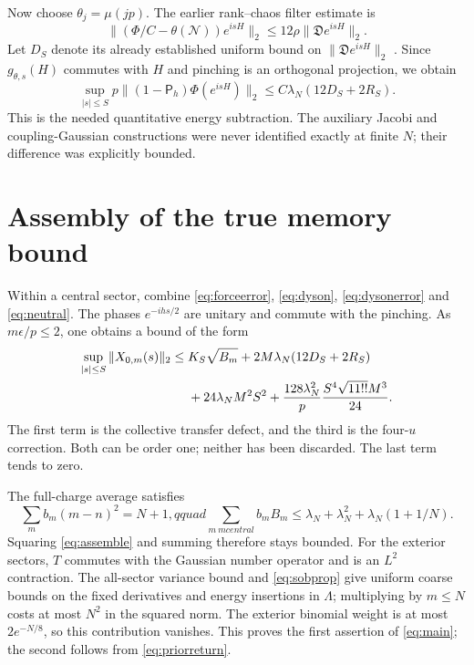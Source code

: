 \documentclass[11pt,a4paper]{article}
\newcommand{\NN}{\mathcal N}
\newcommand{\DD}{\mathfrak D}
\newcommand{\PP}{\mathsf P_h}
\begin{document}
Now choose $\theta_j=\mu(jp)$. The earlier rank--chaos filter estimate is
\begin{equation}
 \|(\Phi/C-\theta(\NN))e^{isH}\|_2
 \le12\rho\|\DD e^{isH}\|_2.
\end{equation}
Let $D_S$ denote its already established uniform bound on
$\|\DD e^{isH}\|_2$ \cite{Rank}. Since $g_{\theta,s}(H)$ commutes
with $H$ and pinching is an orthogonal projection, we obtain
\begin{equation}
 \boxed{\quad
 \sup_{|s|\le S}p\|(1-\PP)\Phi(e^{isH})\|_2
 \le C\lambda_N(12D_S+2R_S).\quad}
 \label{eq:neutral}
\end{equation}
This is the needed quantitative energy subtraction. The auxiliary
Jacobi and coupling-Gaussian constructions were never identified
exactly at finite $N$; their difference was explicitly bounded.

\newpage
\section{Assembly of the true memory bound}
Within a central sector, combine \eqref{eq:forceerror},
\eqref{eq:dyson}, \eqref{eq:dysonerror} and \eqref{eq:neutral}.
The phases $e^{-ihs/2}$ are unitary and commute with the pinching.
As $m\epsilon/p\le2$, one obtains a bound of the form
\begin{align}
 \sup_{|s|\le S}\|X_{0,m}(s)\|_2
 \le{}&K_S\sqrt{B_m}
       +2M\lambda_N(12D_S+2R_S)\notag\\
      &+24\lambda_NM^2S^2
       +\frac{128\lambda_N^2}{p}\frac{S^4\sqrt{11!!}M^3}{24}.
 \label{eq:assemble}
\end{align}
The first term is the collective transfer defect, and the third
is the four-$u$ correction. Both can be order one; neither has been
discarded. The last term tends to zero.

The full-charge average satisfies
\begin{equation}
 \sum_m b_m(m-n)^2=N+1,qquad
 \sum_{m\ {
m central}}b_m B_m
 \le\lambda_N+\lambda_N^2+\lambda_N(1+1/N).
\end{equation}
Squaring \eqref{eq:assemble} and summing therefore stays bounded.
For the exterior sectors, $T$ commutes with the Gaussian number
operator and is an $L^2$ contraction. The all-sector variance bound
and \eqref{eq:sobprop} give uniform coarse bounds on the fixed
derivatives and energy insertions in $\Lambda$; multiplying by
$m\le N$ costs at most $N^2$ in the squared norm. The exterior
binomial weight is at most $2e^{-N/8}$, so this contribution vanishes.
This proves the first assertion of \eqref{eq:main}; the second follows
from \eqref{eq:priorreturn}.
\end{document}
